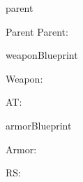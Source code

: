 \documentclass[12pt]{pnpprep}
\begin{document}
\begin{blueprint}{parent}


    \begin{render}
        \begin{panel}{Parent}
            Parent: \namevalue
            \par

            \renderChildren
        \end{panel}
    \end{render}
\end{blueprint}


\begin{blueprint}{weaponBlueprint}

    \begin{render}
        Weapon: \namevalue
        \par
        AT: \ATvalue
        \par
    \end{render}
\end{blueprint}


\begin{blueprint}{armorBlueprint}

    \begin{render}
        Armor: \namevalue
        \par
        RS: \RSvalue
        \par
    \end{render}
\end{blueprint}


\begin{parent}

    \begin{weapon}
    \end{weapon}

    \begin{weapon}
    \end{weapon}

    \begin{armor}
    \end{armor}

\end{parent}
\end{document}
